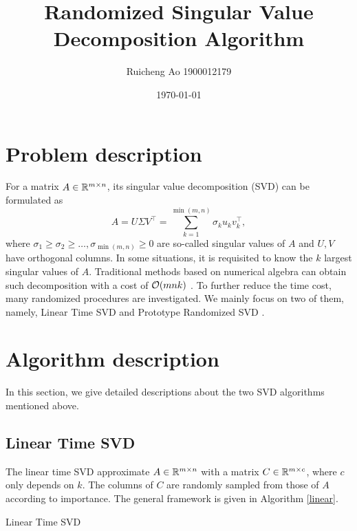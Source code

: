 \documentclass{article}
\title{Randomized Singular Value Decomposition Algorithm}
\date{\today}
\author{Ruicheng Ao 1900012179}
\begin{document}
\maketitle
\section{Problem description}
For a matrix $A\in\mathbb R^{m\times n}$, its singular value decomposition (SVD) can be formulated as 
\begin{equation}\label{svd}
    A = U\Sigma V^\top = \sum_{k=1}^{\min(m,n)}\sigma_ku_kv_k^\top,
\end{equation}
where $\sigma_1\ge\sigma_2\ge\dots,\sigma_{\min(m,n)}\ge 0$ are so-called singular values of $A$ and $U,V$ have orthogonal columns. In some situations, it is requisited to know the $k$ largest singular values of $A$. Traditional methods based on numerical algebra can obtain such decomposition with a cost of $\mathcal O(mnk)$ \cite{golub2013matrix}. To further reduce the time cost, many randomized procedures are investigated. We mainly focus on two of them, namely, Linear Time SVD \cite{drineas2006fast} and Prototype Randomized SVD \cite{halko2011finding}.
\section{Algorithm description}
In this section, we give detailed descriptions about the two SVD algorithms mentioned above.
\subsection{Linear Time SVD}
The linear time SVD approximate $A\in\mathbb R^{m\times n}$ with a matrix $C\in\mathbb R^{m\times c}$, where $c$ only depends on $k$. The columns of $C$ are randomly sampled from those of $A$ according to importance. The general framework is given in Algorithm \ref{linear}.
\begin{algorithm}[p]
    \caption{Linear Time SVD}
    \begin{algorithmic}[1]\label{linear}
        \ENDFOR
        \ENDIF
    \end{algorithmic}
\end{algorithm}
\end{document}
